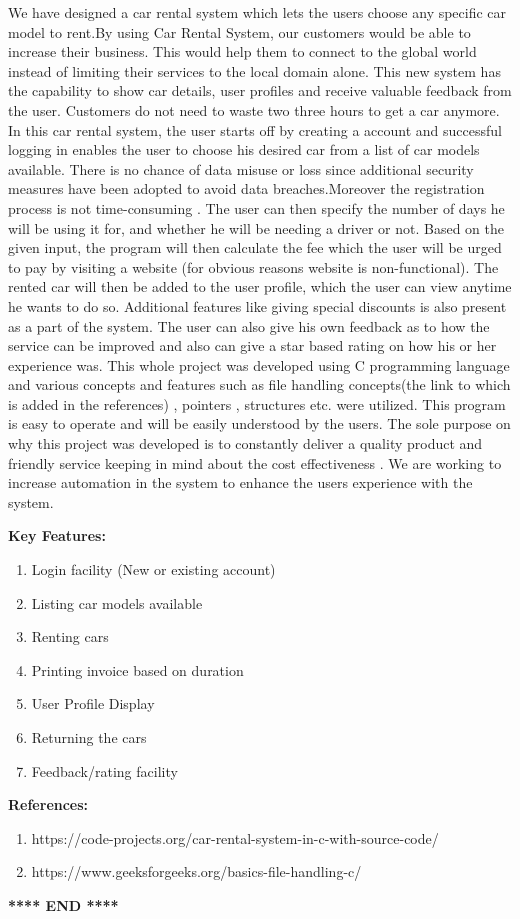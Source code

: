 \documentclass[12pt]{article}
\begin{document}
We have designed a car rental system which lets the users choose any specific car model to rent.By using Car Rental System, our customers would be able to increase their business. This would help them to connect to the global world instead of limiting their services to the local domain alone.
\newline
This new system has the capability to show car details, user profiles and receive valuable feedback from the user. Customers do not need to waste two three hours to get a car anymore.
\newline
In this car rental system, the user starts off by creating a account and successful logging in enables the user to choose his desired car from a list of car models available. There is no chance of data misuse or loss since additional security measures have been adopted to avoid data breaches.Moreover the registration process is not time-consuming . The user can then specify the number of days he will be using it for, and whether he will be needing a driver or not. Based on the given input, the program will then calculate the fee which the user will be urged to pay by visiting a website (for obvious reasons website is non-functional). The rented car will then be added to the user profile, which the user can view anytime he wants to do so. Additional features like giving special discounts is also present as a part of the system. The user can also give his own feedback as to how the service can be improved and also can give a star based rating on how his or her experience was. This whole project was developed using C programming language and various concepts and features such as file handling concepts(the link to which is added in the references) , pointers , structures etc. were utilized. This program is easy to operate and will be easily understood by the users.
The sole purpose on why this project was developed is to constantly deliver a quality product and friendly service keeping in mind about the cost effectiveness . We are working to increase automation in the system to enhance the users experience with the system.

\noindent
\textbf{Key Features:}
\begin{enumerate}
    \item Login facility (New or existing account)
    \item Listing car models available
    \item Renting cars
    \item Printing invoice based on duration
    \item User Profile Display
    \item Returning the cars
    \item Feedback/rating facility
\end{enumerate}

\noindent
\textbf{References:}
\begin{enumerate}
    \item https://code-projects.org/car-rental-system-in-c-with-source-code/
    \item https://www.geeksforgeeks.org/basics-file-handling-c/
\end{enumerate}


\begin{center}
    \textbf{**** END ****}
\end{center}
\end{document}
